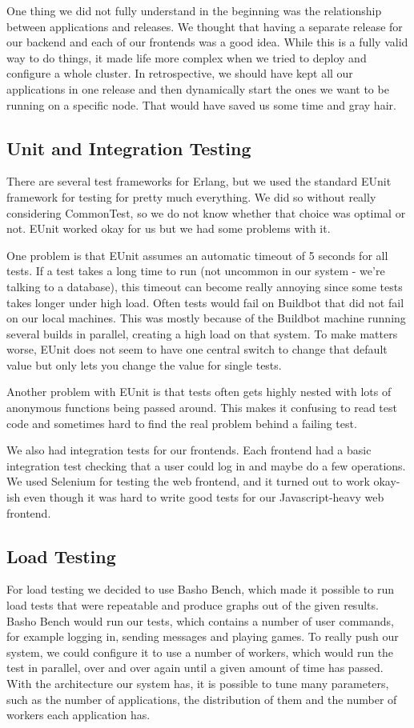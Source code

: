 \documentclass[11pt,a4paper]{report}
\begin{document}
One thing we did not fully understand in the beginning was the relationship
between applications and releases. We thought that having a separate release for
our backend and each of our frontends was a good idea. While this is a fully
valid way to do things, it made life more complex when we tried to deploy and
configure a whole cluster. In retrospective, we should have kept all our
applications in one release and then dynamically start the ones we want to be
running on a specific node. That would have saved us some time and gray hair.
\subsection{Unit and Integration Testing}
There are several test frameworks for Erlang, but we used the standard EUnit
framework for testing for pretty much everything. We did so without really
considering CommonTest, so we do not know whether that choice was optimal or
not. EUnit worked okay for us but we had some problems with it.

One problem is that EUnit assumes an automatic timeout of 5 seconds for all
tests. If a test takes a long time to run (not uncommon in our system - we're
talking to a database), this timeout can become really annoying since some tests
takes longer under high load. Often tests would fail on Buildbot that did not
fail on our local machines. This was mostly because of the Buildbot machine
running several builds in parallel, creating a high load on that system. To make
matters worse, EUnit does not seem to have one central switch to change that
default value but only lets you change the value for single tests.

Another problem with EUnit is that tests often gets highly nested with lots of
anonymous functions being passed around. This makes it confusing to read test
code and sometimes hard to find the real problem behind a failing test.

We also had integration tests for our frontends. Each frontend had a basic
integration test checking that a user could log in and maybe do a few
operations. We used Selenium for testing the web frontend, and it turned out to
work okay-ish even though it was hard to write good tests for our
Javascript-heavy web frontend.
\subsection{Load Testing}
For load testing we decided to use Basho Bench, which made it possible to run
load tests that were repeatable and produce graphs out of the given results.
Basho Bench would run our tests, which contains a number of user commands, for
example logging in, sending messages and playing games. To really push our
system, we could configure it to use a number of workers, which would run the
test in parallel, over and over again until a given amount of time has passed.
With the architecture our system has, it is possible to tune many parameters,
such as the number of applications, the distribution of them and the number of
workers each application has.
\end{document}
